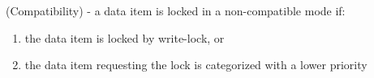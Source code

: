 


 
 

\begin{definition}
\label{compatibility}
(Compatibility) - a data item is locked in a non-compatible mode if:

\begin{enumerate}
  \item the data item is locked by write-lock, or
  \item the data item requesting the lock is categorized with a lower priority
\end{enumerate}
\end{definition}

